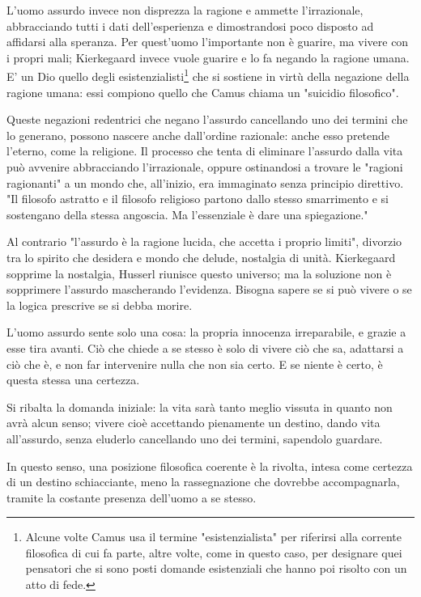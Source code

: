\documentclass[a4paper,12pt,oneside]{article}%
\begin{document}
L'uomo assurdo invece non disprezza la ragione e ammette l'irrazionale, abbracciando tutti i dati dell'esperienza e dimostrandosi poco disposto ad affidarsi alla speranza. Per quest'uomo l'importante non è guarire, ma vivere con i propri mali; Kierkegaard invece vuole guarire e lo fa negando la ragione umana. E' un Dio quello degli esistenzialisti\footnote{Alcune volte Camus usa il termine "esistenzialista" per riferirsi alla corrente filosofica di cui fa parte, altre volte, come in questo caso, per designare quei pensatori che si sono posti domande esistenziali che hanno poi risolto con un atto di fede.} che si sostiene in virtù della negazione della ragione umana: essi compiono quello che Camus chiama un "suicidio filosofico".

Queste negazioni redentrici che negano l'assurdo cancellando uno dei termini che lo generano, possono nascere anche dall'ordine razionale: anche esso pretende l'eterno, come la religione. Il processo che tenta di eliminare l'assurdo dalla vita può avvenire abbracciando l'irrazionale, oppure ostinandosi a trovare le "ragioni ragionanti" a un mondo che, all'inizio, era immaginato senza principio direttivo. "Il filosofo astratto e il filosofo religioso partono dallo stesso smarrimento e si sostengano della stessa angoscia. Ma l'essenziale è dare una spiegazione."

Al contrario "l'assurdo è la ragione lucida, che accetta i proprio limiti", divorzio tra lo spirito che desidera e mondo che delude, nostalgia di unità. Kierkegaard sopprime la nostalgia, Husserl riunisce questo universo; ma la soluzione non è sopprimere l'assurdo mascherando l'evidenza. Bisogna sapere se si può vivere o se la logica prescrive se si debba morire.

L'uomo assurdo sente solo una cosa: la propria innocenza irreparabile, e grazie a esse tira avanti. Ciò che chiede a se stesso è solo di vivere ciò che sa, adattarsi a ciò che è, e non far intervenire nulla che non sia certo. E se niente è certo, è questa stessa una certezza.

Si ribalta la domanda iniziale: la vita sarà tanto meglio vissuta in quanto non avrà alcun senso; vivere cioè accettando pienamente un destino, dando vita all'assurdo, senza eluderlo cancellando uno dei termini, sapendolo guardare.

In questo senso, una posizione filosofica coerente è la rivolta, intesa come certezza di un destino schiacciante, meno la rassegnazione che dovrebbe accompagnarla, tramite la costante presenza dell'uomo a se stesso.




	
	
	
\end{document}
